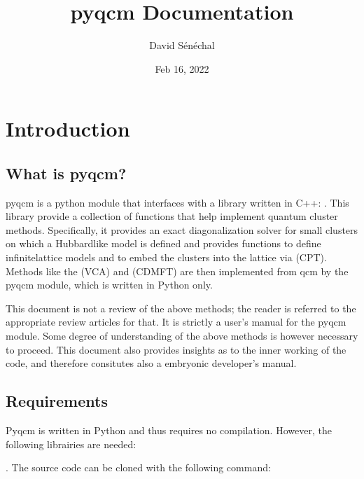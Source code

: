 \documentclass[letterpaper,10pt,english]{sphinxmanual}
\title{pyqcm Documentation}
\date{Feb 16, 2022}
\author{David Sénéchal}
\begin{document}
\pagestyle{empty}
\sphinxmaketitle
\pagestyle{plain}
\sphinxtableofcontents
\pagestyle{normal}
\label{\detokenize{index::doc}}



\chapter{Introduction}
\label{\detokenize{intro:introduction}}\label{\detokenize{intro::doc}}

\section{What is pyqcm?}
\label{\detokenize{intro:what-is-pyqcm}}
\sphinxAtStartPar
pyqcm is a python module that interfaces with a library written in C++: .
This library provide a collection of functions that help implement quantum cluster methods.
Specifically, it provides an exact diagonalization solver for small clusters on which a Hubbard\sphinxhyphen{}like model is defined and provides functions to define infinite\sphinxhyphen{}lattice models and to embed the clusters into the lattice via  (CPT). Methods like the  (VCA) and  (CDMFT) are then implemented from qcm by the pyqcm module, which is written in Python only.

\sphinxAtStartPar
This document is not a review of the above methods; the reader is referred to the appropriate review articles for that. It is strictly a user’s manual for the pyqcm module.
Some degree of understanding of the above methods is however necessary to proceed.
This document also provides insights as to the inner working of the code, and therefore consitutes also a embryonic developer’s manual.


\section{Requirements}
\label{\detokenize{intro:requirements}}
\sphinxAtStartPar
Pyqcm is written in Python and thus requires no compilation.
However, the following librairies are needed:

\sphinxAtStartPar
{}. The source code can be cloned with the following command:

\begin{sphinxVerbatim}[commandchars=\\\{\}]
  
\end{sphinxVerbatim}
\end{document}
